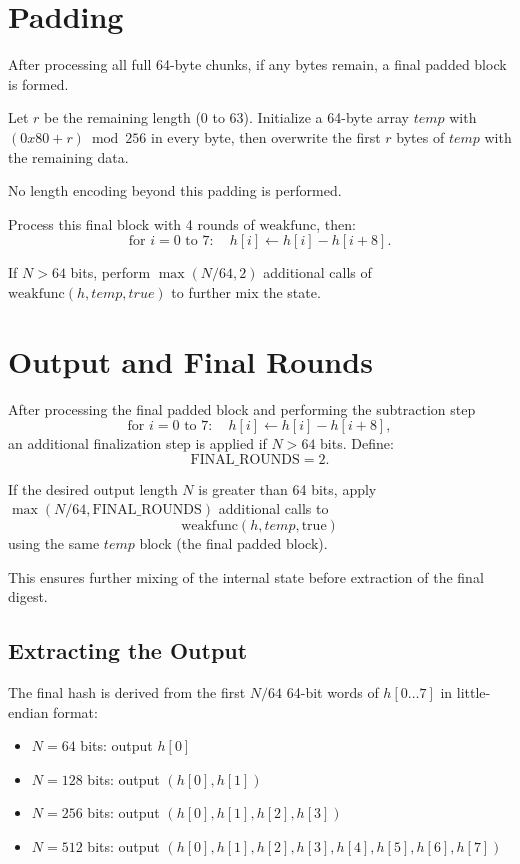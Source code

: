 \documentclass[11pt,a4paper]{article}
\begin{document}
\section*{Padding}
After processing all full 64-byte chunks, if any bytes remain, a final padded block is formed.

Let $r$ be the remaining length (0 to 63). Initialize a 64-byte array $temp$ with $(0x80 + r) \bmod 256$ in every byte, then overwrite the first $r$ bytes of $temp$ with the remaining data.

No length encoding beyond this padding is performed.

Process this final block with 4 rounds of $\text{weakfunc}$, then:
\[
\text{for } i=0 \text{ to } 7:\quad h[i] \leftarrow h[i] - h[i+8].
\]

If $N > 64$ bits, perform $\max(N/64, 2)$ additional calls of $\text{weakfunc}(h, temp, true)$ to further mix the state.

\section*{Output and Final Rounds}
After processing the final padded block and performing the subtraction step
\[
\text{for } i=0 \text{ to } 7:\quad h[i] \leftarrow h[i] - h[i+8],
\]
an additional finalization step is applied if $N > 64$ bits. Define:
\[
\text{FINAL\_ROUNDS} = 2.
\]

If the desired output length $N$ is greater than 64 bits, apply $\max(N/64, \text{FINAL\_ROUNDS})$ additional calls to
\[
\text{weakfunc}(h, temp, \text{true})
\]
using the same $temp$ block (the final padded block).

This ensures further mixing of the internal state before extraction of the final digest.

\subsection*{Extracting the Output}
The final hash is derived from the first $N/64$ 64-bit words of $h[0 \ldots 7]$ in little-endian format:

\begin{itemize}
  \item $N=64$ bits: output $h[0]$
  \item $N=128$ bits: output $(h[0], h[1])$
  \item $N=256$ bits: output $(h[0], h[1], h[2], h[3])$
  \item $N=512$ bits: output $(h[0], h[1], h[2], h[3], h[4], h[5], h[6], h[7])$
\end{itemize}
\end{document}
